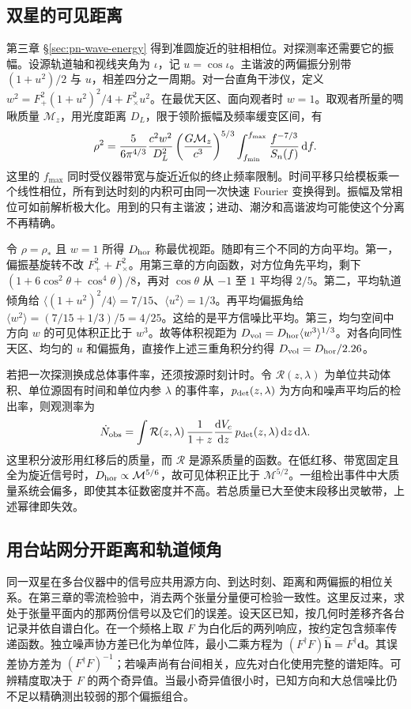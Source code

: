 \subsection{双星的可见距离}
第三章 \S\ref{sec:pn-wave-energy} 得到准圆旋近的驻相相位。对探测率还需要它的振幅。设源轨道轴和视线夹角为 $\iota$，记 $u=\cos\iota$。主谐波的两偏振分别带 $(1+u^2)/2$ 与 $u$，相差四分之一周期。对一台直角干涉仪，定义 $w^2=F_+^2(1+u^2)^2/4+F_\times^2u^2$。在最优天区、面向观者时 $w=1$。取观者所量的啁啾质量 $\mathcal M_z$，用光度距离 $D_L$，限于领阶振幅及频率缓变区间，有
\[
 \rho^2=\frac{5}{6\pi^{4/3}}\frac{c^2w^2}{D_L^2}
       \left(\frac{G\mathcal M_z}{c^3}\right)^{5/3}
       \int_{f_{\min}}^{f_{\max}}\frac{f^{-7/3}}{S_n(f)}\,\dd f .
\]
这里的 $f_{\max}$ 同时受仪器带宽与旋近近似的终止频率限制。时间平移只给模板乘一个线性相位，所有到达时刻的内积可由同一次快速 Fourier 变换得到。振幅及常相位可如前解析极大化。用到的只有主谐波；进动、潮汐和高谐波均可能使这个分离不再精确。

令 $\rho=\rho_*$ 且 $w=1$ 所得 $D_{\rm hor}$ 称最优视距。随即有三个不同的方向平均。第一，偏振基旋转不改 $F_+^2+F_\times^2$。用第三章的方向函数，对方位角先平均，剩下 $(1+6\cos^2\theta+\cos^4\theta)/8$，再对 $\cos\theta$ 从 $-1$ 至 $1$ 平均得 $2/5$。第二，平均轨道倾角给 $\langle(1+u^2)^2/4\rangle=7/15$、$\langle u^2\rangle=1/3$。再平均偏振角给 $\langle w^2\rangle=(7/15+1/3)/5=4/25$。这给的是平方信噪比平均。第三，均匀空间中方向 $w$ 的可见体积正比于 $w^3$。故等体积视距为 $D_{\rm vol}=D_{\rm hor}\langle w^3\rangle^{1/3}$。对各向同性天区、均匀的 $u$ 和偏振角，直接作上述三重角积分约得 $D_{\rm vol}=D_{\rm hor}/2.26$。

若把一次探测换成总体事件率，还须按源时刻计时。令 $\mathcal R(z,\lambda)$ 为单位共动体积、单位源固有时间和单位内参 $\lambda$ 的事件率，$p_{\rm det}(z,\lambda)$ 为方向和噪声平均后的检出率，则观测率为
\[
 \dot N_{\rm obs}=\int \mathcal R(z,\lambda)\,\frac{1}{1+z}
 \frac{\dd V_c}{\dd z}\,p_{\rm det}(z,\lambda)\,\dd z\,\dd\lambda .
\]
这里积分波形用红移后的质量，而 $\mathcal R$ 是源系质量的函数。在低红移、带宽固定且全为旋近信号时，$D_{\rm hor}\propto\mathcal M^{5/6}$，故可见体积正比于 $\mathcal M^{5/2}$。一组检出事件中大质量系统会偏多，即使其本征数密度并不高。若总质量已大至使末段移出灵敏带，上述幂律即失效。

\subsection{用台站网分开距离和轨道倾角}
同一双星在多台仪器中的信号应共用源方向、到达时刻、距离和两偏振的相位关系。在第三章的零流检验中，消去两个张量分量便可检验一致性。这里反过来，求处于张量平面内的那两份信号以及它们的误差。设天区已知，按几何时差移齐各台记录并依自谱白化。在一个频格上取 $F$ 为白化后的两列响应，按约定包含频率传递函数。独立噪声协方差已化为单位阵，最小二乘方程为 $(F^\dagger F)\hat{\bm h}=F^\dagger\bm d$。其误差协方差为 $(F^\dagger F)^{-1}$；若噪声尚有台间相关，应先对白化使用完整的谱矩阵。可辨精度取决于 $F$ 的两个奇异值。当最小奇异值很小时，已知方向和大总信噪比仍不足以精确测出较弱的那个偏振组合。

